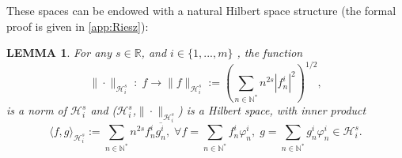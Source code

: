 \documentclass[11pt, dvipsnames]{amsart}
\newtheorem{lem}[theorem]{LEMMA}
\begin{document}
These spaces can be endowed with a natural Hilbert space structure (the formal proof is given in \ref{app:Riesz}):
\begin{lem}
\label{lem:structure}
For any $s \in\mathbb{R}$, and $i \in \{1,...,m\}$ , the 
function
\begin{equation}
\|\cdot\|_{\mathcal{H}^{s}_{i}}\;:\;f\rightarrow \|f\|_{\mathcal{H}^{s}_{i}} := \left(\sum_{n\in \mathbb{N^*}}n^{2s}|f_{n}^i|^{2}\right)^{1/2},
\end{equation}
is a norm of $\mathcal{H}^{s}_{i}$ and ($\mathcal{H}^{s}_{i}$,$\|\cdot\|_{\mathcal{H}^{s}_{i}}$) is a Hilbert space, with inner product
\begin{equation}
\label{eq:inner}
    \langle f,g\rangle _{\mathcal{H}^s_{i}} :=\sum_{n\in \mathbb{N^*}}n^{2s}f_{n}^{i}\overline{g_{n}^{i}},\;\forall f =\sum\limits_{n\in\mathbb{N}^{*}}f_{n}^{i}\varphi_{n}^{i},\; g = \sum\limits_{n\in\mathbb{N}^{*}}g_{n}^{i}\varphi_{n}^{i}\in \mathcal{H}^s_{i}.
\end{equation}
\end{lem}
\end{document}
